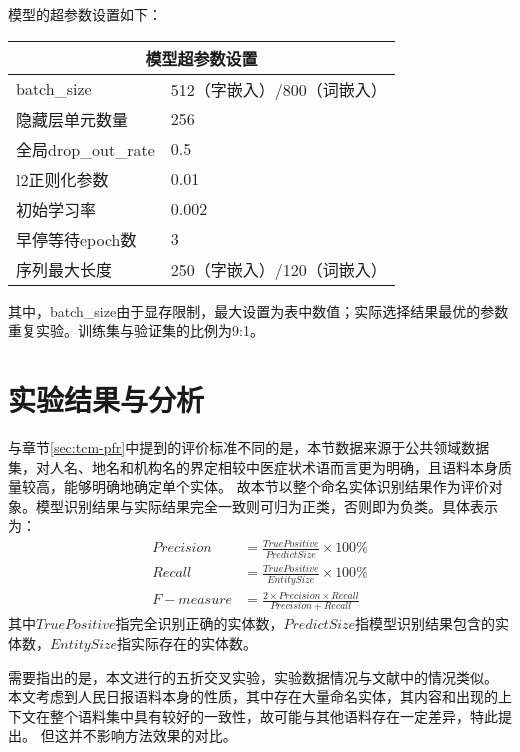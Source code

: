 模型的超参数设置如下：
\begin{table}[H]
    \centering
    \begin{tabular}{ll}
        \toprule
        \multicolumn{2}{c}{模型超参数设置} \\
        \midrule
        batch\_size & 512（字嵌入）/800（词嵌入） \\
        隐藏层单元数量 & 256\\
        全局drop\_out\_rate & 0.5 \\
        l2正则化参数 & 0.01 \\
        初始学习率 & 0.002 \\
        早停等待epoch数 & 3\\
        序列最大长度 & 250（字嵌入）/120（词嵌入）\\
        \bottomrule
    \end{tabular}
\end{table}
其中，batch\_size由于显存限制，最大设置为表中数值；实际选择结果最优的参数重复实验。训练集与验证集的比例为9:1。

\section{实验结果与分析}
与章节\ref{sec:tcm-pfr}中提到的评价标准不同的是，本节数据来源于公共领域数据集，对人名、地名和机构名的界定相较中医症状术语而言更为明确，且语料本身质量较高，能够明确地确定单个实体。
故本节以整个命名实体识别结果作为评价对象。模型识别结果与实际结果完全一致则可归为正类，否则即为负类。具体表示为：
\begin{align}
    Precision &= \frac{True Positive}{Predict Size} \times 100\% \\
    Recall &= \frac{True Positive}{Entity Size} \times 100\% \\
    F-measure &= \frac{2\times Precision \times Recall}{Precision + Recall}
\end{align}
其中$True Positive$指完全识别正确的实体数，$Predict Size$指模型识别结果包含的实体数，$Entity Size$指实际存在的实体数。

需要指出的是，本文进行的五折交叉实验，实验数据情况与文献中的情况类似。
本文考虑到人民日报语料本身的性质，其中存在大量命名实体，其内容和出现的上下文在整个语料集中具有较好的一致性，故可能与其他语料存在一定差异，特此提出。
但这并不影响方法效果的对比。

